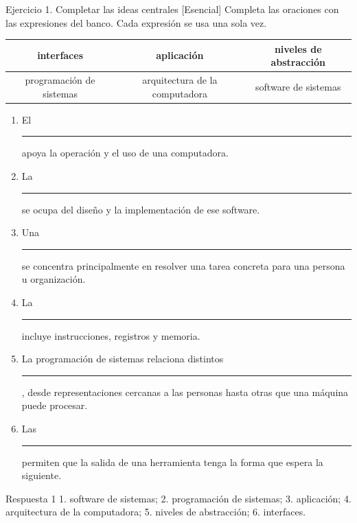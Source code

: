 \documentclass[11pt,spanish]{article}
\newcommand{\blank}[1][4cm]{\rule{#1}{0.4pt}}
\begin{document}
\begin{ejercicio}{Ejercicio 1. Completar las ideas centrales \hfill {\small [Esencial]}}
Completa las oraciones con las expresiones del banco. Cada expresión se usa una sola vez.

\begin{center}
\small
\begin{tabular}{|c|c|c|}
\hline
interfaces & aplicación & niveles de abstracción \tabularnewline
\hline
programación de sistemas & arquitectura de la computadora & software de sistemas \tabularnewline
\hline
\end{tabular}
\end{center}

\begin{enumerate}[leftmargin=*]
    \item El \blank[5.4cm] apoya la operación y el uso de una computadora.
    \item La \blank[5.4cm] se ocupa del diseño y la implementación de ese software.
    \item Una \blank[5.4cm] se concentra principalmente en resolver una tarea concreta para una persona u organización.
    \item La \blank[6cm] incluye instrucciones, registros y memoria.
    \item La programación de sistemas relaciona distintos \blank[5.5cm], desde representaciones cercanas a las personas hasta otras que una máquina puede procesar.
    \item Las \blank[5cm] permiten que la salida de una herramienta tenga la forma que espera la siguiente.
\end{enumerate}
\end{ejercicio}

\ifrespuestas
\begin{respuesta}{Respuesta 1}
1. software de sistemas; 2. programación de sistemas; 3. aplicación; 4. arquitectura de la computadora; 5. niveles de abstracción; 6. interfaces.
\end{respuesta}
\fi
\end{document}
